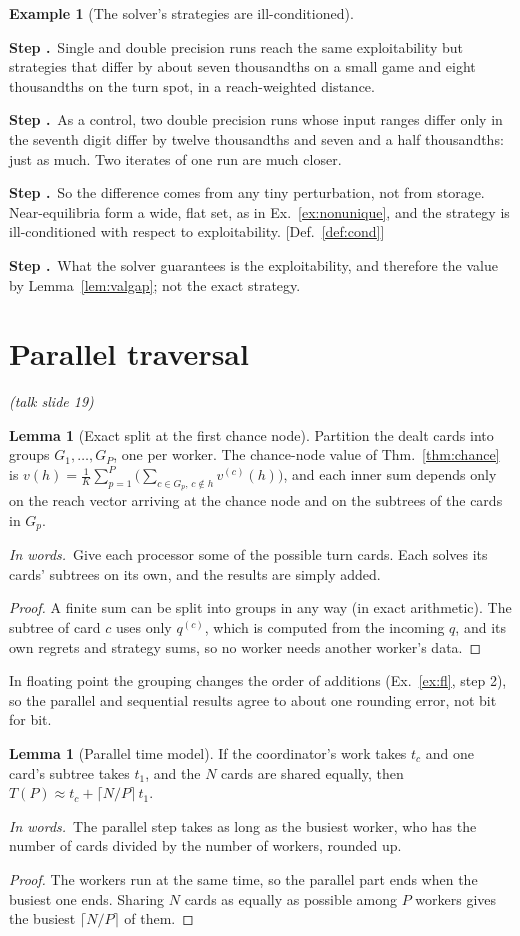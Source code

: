 \documentclass[11pt]{article}
\theoremstyle{definition}
\newtheorem{example}[definition]{Example}
\newtheorem{lemma}[definition]{Lemma}
\newcommand{\inwords}{\par\smallskip\noindent\textit{In words.}\ }
\newcounter{stp}
\newcommand{\steps}{\setcounter{stp}{0}}
\newcommand{\st}{\stepcounter{stp}\par\medskip\noindent\textbf{Step \arabic{stp}.}\ }
\newcommand{\by}[1]{\hfill{\small\color{blue!50!black}[#1]}}
\newcommand{\Def}[1]{Def.~\ref{#1}}\newcommand{\Lem}[1]{Lemma~\ref{#1}}\newcommand{\Thm}[1]{Thm.~\ref{#1}}
\newcommand{\Ex}[1]{Ex.~\ref{#1}}\newcommand{\Rem}[1]{Remark~\ref{#1}}\newcommand{\Alg}[1]{Alg.~\ref{#1}}\newcommand{\Cor}[1]{Cor.~\ref{#1}}
\newcommand{\slide}[1]{\hfill{\small\itshape (talk slide #1)}}
\begin{document}
\begin{example}[The solver's strategies are ill-conditioned]\label{ex:solvecond}
\steps
\st Single and double precision runs reach the same exploitability but strategies that differ by about seven thousandths on
a small game and eight thousandths on the turn spot, in a reach-weighted distance.
\st As a control, two double precision runs whose input ranges differ only in the seventh digit differ by twelve thousandths
and seven and a half thousandths: just as much. Two iterates of one run are much closer.
\st So the difference comes from any tiny perturbation, not from storage. Near-equilibria form a wide, flat set, as in
\Ex{ex:nonunique}, and the strategy is ill-conditioned with respect to exploitability. \by{\Def{def:cond}}
\st What the solver guarantees is the exploitability, and therefore the value by \Lem{lem:valgap}; not the exact strategy.
\end{example}

\section{Parallel traversal}\label{sec:par}\slide{19}
\begin{lemma}[Exact split at the first chance node]\label{lem:split}
Partition the dealt cards into groups $G_1,\dots,G_P$, one per worker. The chance-node value of \Thm{thm:chance} is
$v(h)=\frac1K\sum_{p=1}^P\Big(\sum_{c\in G_p,\,c\notin h}v^{(c)}(h)\Big)$, and each inner sum depends only on the reach vector arriving
at the chance node and on the subtrees of the cards in $G_p$.
\inwords Give each processor some of the possible turn cards. Each solves its cards' subtrees on its own, and the results
are simply added.
\end{lemma}
\begin{proof}
A finite sum can be split into groups in any way (in exact arithmetic). The subtree of card $c$ uses only $q^{(c)}$, which
is computed from the incoming $q$, and its own regrets and strategy sums, so no worker needs another worker's data.
\end{proof}
In floating point the grouping changes the order of additions (\Ex{ex:fl}, step 2), so the parallel and sequential
results agree to about one rounding error, not bit for bit.

\begin{lemma}[Parallel time model]\label{lem:partime}
If the coordinator's work takes $t_c$ and one card's subtree takes $t_1$, and the $N$ cards are shared equally, then
$T(P)\approx t_c+\lceil N/P\rceil\,t_1$.
\inwords The parallel step takes as long as the busiest worker, who has the number of cards divided by the number of
workers, rounded up.
\end{lemma}
\begin{proof}
The workers run at the same time, so the parallel part ends when the busiest one ends. Sharing $N$ cards as equally as
possible among $P$ workers gives the busiest $\lceil N/P\rceil$ of them.
\end{proof}
\end{document}
